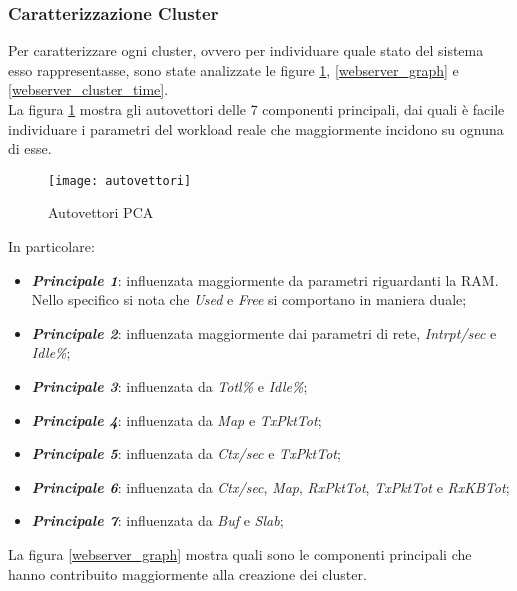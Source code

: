 \clearpage

\subsubsection{Caratterizzazione Cluster}
Per caratterizzare ogni cluster, ovvero per individuare quale stato del sistema
esso rappresentasse, sono state analizzate le figure \ref{webserver_autovettori}, \ref{webserver_graph}
e \ref{webserver_cluster_time}.\\
La figura \ref{webserver_autovettori} mostra gli autovettori delle 7 componenti principali,
dai quali è facile individuare i parametri del workload reale che maggiormente
incidono su ognuna di esse.\\
\begin{figure}[!htbp]
  \centering
  \texttt{[image: autovettori]}
  \caption{Autovettori PCA}
  \label{webserver_autovettori}
\end{figure}

In particolare:

\begin{itemize}
  \item \textbf{\textit{Principale 1}}: influenzata maggiormente da parametri
  riguardanti la RAM.\\
  Nello specifico si nota che \textit{Used} e \textit{Free} si comportano in maniera duale;
  \item \textbf{\textit{Principale 2}}: influenzata maggiormente dai parametri
  di rete, \textit{Intrpt/sec} e \textit{Idle\%};
  \item \textbf{\textit{Principale 3}}: influenzata da \textit{Totl\%} e \textit{Idle\%};
  \item \textbf{\textit{Principale 4}}: influenzata da \textit{Map} e \textit{TxPktTot};
  \item \textbf{\textit{Principale 5}}: influenzata da \textit{Ctx/sec} e \textit{TxPktTot};
  \item \textbf{\textit{Principale 6}}: influenzata da \textit{Ctx/sec}, \textit{Map},
  \textit{RxPktTot}, \textit{TxPktTot} e \textit{RxKBTot};
  \item \textbf{\textit{Principale 7}}: influenzata da \textit{Buf} e \textit{Slab};
\end{itemize}

\clearpage

La figura \ref{webserver_graph} mostra quali sono le componenti principali che hanno contribuito
maggiormente alla creazione dei cluster.\\

